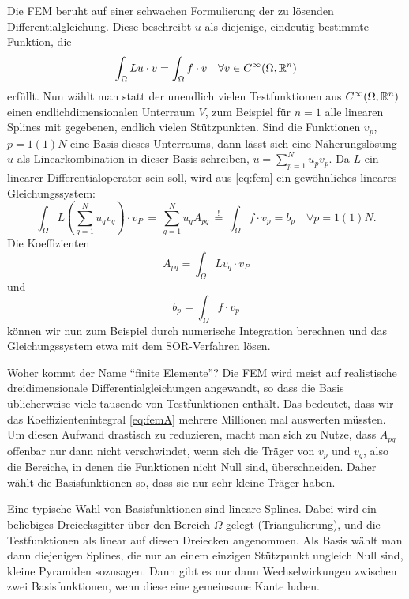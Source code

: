 Die FEM beruht auf einer schwachen Formulierung der zu lösenden
Differentialgleichung. Diese beschreibt $u$ als diejenige, eindeutig
bestimmte Funktion, die
\begin{equation}
  \label{eq:fem}
  \int_\Omega Lu\cdot v = \int_\Omega f\cdot v\quad\forall v\in
  C^\infty(\Omega, \mathbb{R}^n)
\end{equation}
erfüllt. Nun wählt man statt der unendlich vielen Testfunktionen aus
$C^\infty(\Omega, \mathbb{R}^n)$ einen endlichdimensionalen Unterraum $V$,
zum Beispiel für $n=1$ alle linearen Splines mit gegebenen, endlich
vielen Stützpunkten. Sind die Funktionen $v_p$, $p=1(1)N$ eine Basis
dieses Unterraums, dann lässt sich eine Näherungslösung $u$ als
Linearkombination in dieser Basis schreiben, $u=\sum_{p=1}^N
u_pv_p$. Da $L$ ein linearer Differentialoperator sein soll, wird aus
\eqref{eq:fem} ein gewöhnliches lineares Gleichungssystem:
\begin{equation}
  \int_\Omega L\left(\sum_{q=1}^N
    u_qv_q\right)\cdot v_P \,=\, \sum_{q=1}^N
  u_q A_{pq} \,\stackrel{!}{=}\,
  \int_\Omega f\cdot v_p = b_p\quad\forall p=1(1)N.
\end{equation}
Die Koeffizienten
\begin{equation}
  \label{eq:femA}
  A_{pq} = \int_\Omega L v_q\cdot v_P
\end{equation}
und
\begin{equation}
  \label{eq:femb}
  b_p = \int_\Omega f\cdot v_p
\end{equation}
können wir nun zum Beispiel durch numerische Integration
berechnen und das Gleichungssystem etwa mit dem SOR-Verfahren
lösen.

Woher kommt der Name "`finite Elemente"'? Die FEM wird meist auf
realistische dreidimensionale Differentialgleichungen angewandt, so
dass die Basis üblicherweise viele tausende von Testfunktionen
enthält. Das bedeutet, dass wir das Koeffizientenintegral
\eqref{eq:femA} mehrere Millionen mal auswerten müssten. Um diesen
Aufwand drastisch zu reduzieren, macht man sich zu Nutze, dass
$A_{pq}$ offenbar nur dann nicht verschwindet, wenn sich die Träger
von $v_p$ und $v_q$, also die Bereiche, in denen die Funktionen nicht
Null sind, überschneiden. Daher wählt die Basisfunktionen so, dass sie
nur sehr kleine Träger haben.

Eine typische Wahl von Basisfunktionen sind lineare Splines. Dabei
wird ein beliebiges Dreiecksgitter über den Bereich $\Omega$ gelegt
(Triangulierung), und die Testfunktionen als linear auf diesen
Dreiecken angenommen. Als Basis wählt man dann diejenigen Splines, die
nur an einem einzigen Stützpunkt ungleich Null sind, kleine Pyramiden
sozusagen. Dann gibt es nur dann Wechselwirkungen zwischen zwei
Basisfunktionen, wenn diese eine gemeinsame Kante haben.

